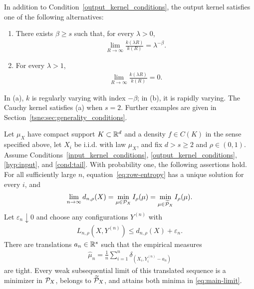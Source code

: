 \begin{condition}\label{cond:tail}
In addition to Condition~\ref{output_kernel_conditions}, the output kernel satisfies one of the following alternatives:
\begin{enumerate}[label=(\alph*),leftmargin=*,itemsep=4pt]
\item There exists $\beta\geq s$ such that, for every $\lambda>0$,
\begin{align}\label{eq:regular-tail}
\lim_{R\to\infty}\frac{k(\lambda R)}{k(R)}=\lambda^{-\beta}.
\end{align}
\item For every $\lambda>1$,
\begin{align}\label{eq:rapid-tail}
\lim_{R\to\infty}\frac{k(\lambda R)}{k(R)}=0.
\end{align}
\end{enumerate}
\end{condition}
In (a), $k$ is regularly varying with index $-\beta$; in (b), it is rapidly varying. The Cauchy kernel satisfies (a) when $s=2$. Further examples are given in Section~\ref{tsne:sec:generality_conditions}.

\begin{theorem}\label{tsne:main_theorem_1}
Let $\mu_X$ have compact support $K\subset\mathbb{R}^d$ and a density $f\in C(K)$ in the sense specified above, let $X_i$ be i.i.d. with law $\mu_X$, and fix $d>s\geq2$ and $\rho\in(0,1)$. Assume Conditions~\ref{input_kernel_conditions}, \ref{output_kernel_conditions}, \ref{hyp:input}, and \ref{cond:tail}. With probability one, the following assertions hold. For all sufficiently large $n$, equation~\eqref{eq:row-entropy} has a unique solution for every $i$, and
\begin{align}\label{eq:main-limit}
\lim_{n\to\infty}d_{n,\rho}(X)
=\min_{\mu\in\mathcal P_X}I_\rho(\mu)
=\min_{\mu\in\widetilde{\mathcal P}_X}I_\rho(\mu).
\end{align}
Let $\varepsilon_n\downarrow0$ and choose any configurations $Y^{(n)}$ with
\begin{align}\label{eq:near-minima}
L_{n,\rho}(X,Y^{(n)})\leq d_{n,\rho}(X)+\varepsilon_n.
\end{align}
There are translations $a_n\in\mathbb{R}^s$ such that the empirical measures
\begin{align}\label{eq:translated-empirical}
\widehat\mu_n=\frac1n\sum_{i=1}^n\delta_{(X_i,Y_i^{(n)}-a_n)}
\end{align}
are tight. Every weak subsequential limit of this translated sequence is a minimizer in $\mathcal P_X$, belongs to $\widetilde{\mathcal P}_X$, and attains both minima in \eqref{eq:main-limit}.
\end{theorem}

